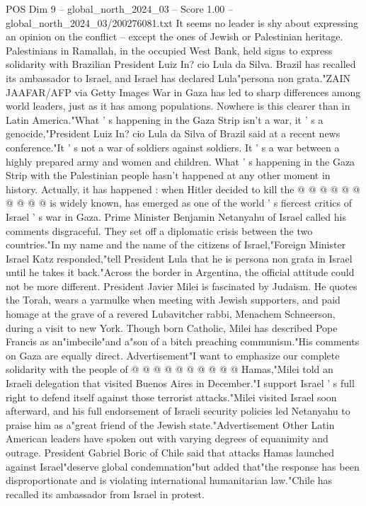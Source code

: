 \begin{textsample}{POS Dim 9 – global\_north\_2024\_03 – Score 1.00 – global\_north\_2024\_03/200276081.txt}  \label{ex:f9_pos_274}
It seems no leader is shy about expressing an opinion on the conflict -- except the ones of Jewish or Palestinian heritage.
Palestinians in Ramallah, in the occupied West Bank, held signs to express solidarity with Brazilian President Luiz In? cio Lula da Silva.
Brazil has recalled its ambassador to Israel, and Israel has declared Lula"persona non grata."ZAIN JAAFAR/AFP via Getty Images War in Gaza has led to sharp differences among world leaders, just as it has among populations.
Nowhere is this clearer than in Latin America."What ' s happening in the Gaza Strip isn't a war, it ' s a genocide,"President Luiz In? cio Lula da Silva of Brazil said at a recent news conference."It ' s not a war of soldiers against soldiers.
It ' s a war between a highly prepared army and women and children.
What ' s happening in the Gaza Strip with the Palestinian people hasn't happened at any other moment in history.
Actually, it has happened : when Hitler decided to kill the @ @ @ @ @ @ @ @ @ @ is widely known, has emerged as one of the world ' s fiercest critics of Israel ' s war in Gaza.
Prime Minister Benjamin Netanyahu of Israel called his comments disgraceful.
They set off a diplomatic crisis between the two countries."In my name and the name of the citizens of Israel,"Foreign Minister Israel Katz responded,"tell President Lula that he is persona non grata in Israel until he takes it back."Across the border in Argentina, the official attitude could not be more different.
President Javier Milei is fascinated by Judaism.
He quotes the Torah, wears a yarmulke when meeting with Jewish supporters, and paid homage at the grave of a revered Lubavitcher rabbi, Menachem Schneerson, during a visit to new York.
Though born Catholic, Milei has described Pope Francis as an"imbecile"and a"son of a bitch preaching communism."His comments on Gaza are equally direct.
Advertisement"I want to emphasize our complete solidarity with the people of @ @ @ @ @ @ @ @ @ @ Hamas,"Milei told an Israeli delegation that visited Buenos Aires in December."I support Israel ' s full right to defend itself against those terrorist attacks."Milei visited Israel soon afterward, and his full endorsement of Israeli security policies led Netanyahu to praise him as a"great friend of the Jewish state."Advertisement Other Latin American leaders have spoken out with varying degrees of equanimity and outrage.
President Gabriel Boric of Chile said that attacks Hamas launched against Israel"deserve global condemnation"but added that"the response has been disproportionate and is violating international humanitarian law."Chile has recalled its ambassador from Israel in protest.

\end{textsample}
